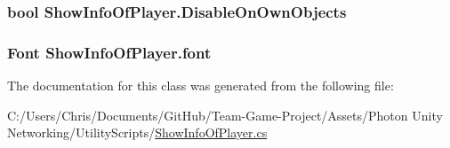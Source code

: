 \subsubsection[{\texorpdfstring{Disable\+On\+Own\+Objects}{DisableOnOwnObjects}}]{\setlength{\rightskip}{0pt plus 5cm}bool Show\+Info\+Of\+Player.\+Disable\+On\+Own\+Objects}\hypertarget{class_show_info_of_player_a4f3344f49a450e169bce73cb3c1acd42}{}\label{class_show_info_of_player_a4f3344f49a450e169bce73cb3c1acd42}
\subsubsection[{\texorpdfstring{font}{font}}]{\setlength{\rightskip}{0pt plus 5cm}Font Show\+Info\+Of\+Player.\+font}\hypertarget{class_show_info_of_player_ad21009b17d92004b3172cc7e63eac70e}{}\label{class_show_info_of_player_ad21009b17d92004b3172cc7e63eac70e}


The documentation for this class was generated from the following file\+:\begin{DoxyCompactItemize}
\item 
C\+:/\+Users/\+Chris/\+Documents/\+Git\+Hub/\+Team-\/\+Game-\/\+Project/\+Assets/\+Photon Unity Networking/\+Utility\+Scripts/\hyperlink{_show_info_of_player_8cs}{Show\+Info\+Of\+Player.\+cs}\end{DoxyCompactItemize}
